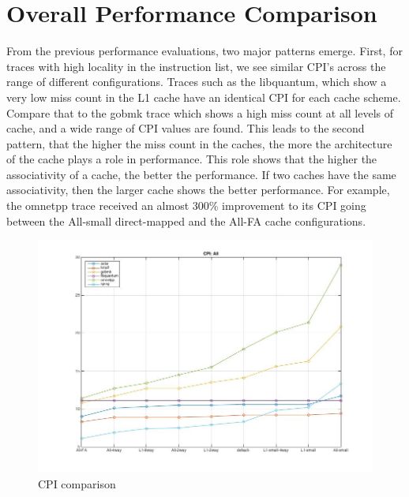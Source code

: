 \documentclass[11pt,titlepage]{article}
\begin{document}
    \section{Overall Performance Comparison}
    From the previous performance evaluations, two major patterns emerge. First, for traces with high locality in the instruction list, we see similar CPI's across the range of different configurations. Traces such as the libquantum, which show a very low miss count in the L1 cache have an identical CPI for each cache scheme. Compare that to the gobmk trace which shows a high miss count at all levels of cache, and a wide range of CPI values are found. This leads to the second pattern, that the higher the miss count in the caches, the more the architecture of the cache plays a role in performance. This role shows that the higher the associativity of a cache, the better the performance. If two caches have the same associativity, then the larger cache shows the better performance. For example, the omnetpp trace received an almost 300\% improvement to its CPI going between the All-small direct-mapped and the All-FA cache configurations.  
     \begin{figure}[H]
      \centering
      \includegraphics[scale=0.45]{CPIall}
      \caption{CPI comparison}
      \label{fig:CPIall}
    \end{figure}
\end{document}
